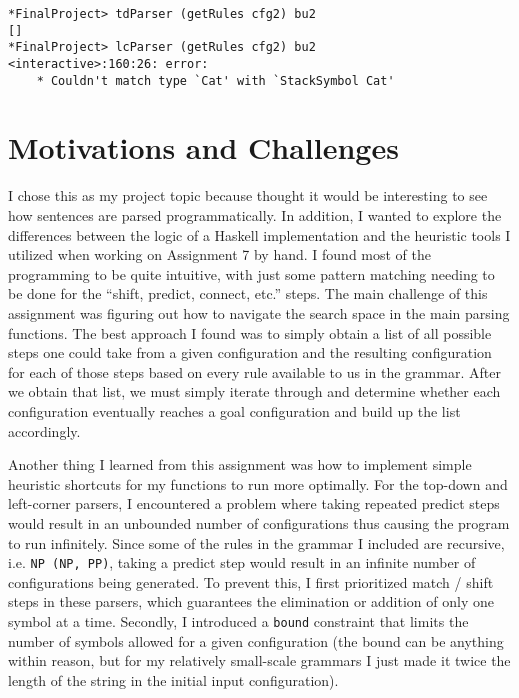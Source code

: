 \documentclass[12pt, letterpaper]{article}
\begin{document}
\begin{lstlisting}[frame=single]
*FinalProject> tdParser (getRules cfg2) bu2
[]
*FinalProject> lcParser (getRules cfg2) bu2
<interactive>:160:26: error:
    * Couldn't match type `Cat' with `StackSymbol Cat'
\end{lstlisting}

\section{Motivations and Challenges}
I chose this as my project topic because thought it would be interesting to see how sentences are parsed programmatically. In addition, I wanted to explore the differences between the logic of a Haskell implementation and the heuristic tools I utilized when working on Assignment 7 by hand. I found most of the programming to be quite intuitive, with just some pattern matching needing to be done for the “shift, predict, connect, etc.” steps. The main challenge of this assignment was figuring out how to navigate the search space in the main parsing functions. The best approach I found was to simply obtain a list of all possible steps one could take from a given configuration and the resulting configuration for each of those steps based on every rule available to us in the grammar. After we obtain that list, we must simply iterate through and determine whether each configuration eventually reaches a goal configuration and build up the list accordingly. 

Another thing I learned from this assignment was how to implement simple heuristic shortcuts for my functions to run more optimally. For the top-down and left-corner parsers,  I encountered a problem where taking repeated predict steps would result in an unbounded number of configurations thus causing the program to run infinitely. Since some of the rules in the grammar I included are recursive, i.e. \verb|NP (NP, PP)|, taking a predict step would result in an infinite number of configurations being generated. To prevent this, I first prioritized match / shift steps in these parsers, which guarantees the elimination or addition of only one symbol at a time. Secondly, I introduced a \verb|bound| constraint that limits the number of symbols allowed for a given configuration (the bound can be anything within reason, but for my relatively small-scale grammars I just made it twice the length of the string in the initial input configuration).
\end{document}
